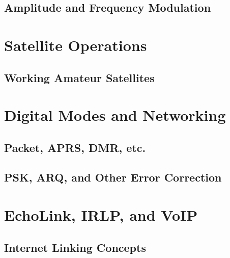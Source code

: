\documentclass[12pt]{book}
\begin{document}
\section{Amplitude and Frequency Modulation}




\chapter{Satellite Operations}
\section{Working Amateur Satellites}



\chapter{Digital Modes and Networking}
\section{Packet, APRS, DMR, etc.}





\section{PSK, ARQ, and Other Error Correction}


\chapter{EchoLink, IRLP, and VoIP}
\section{Internet Linking Concepts}



\end{document}
